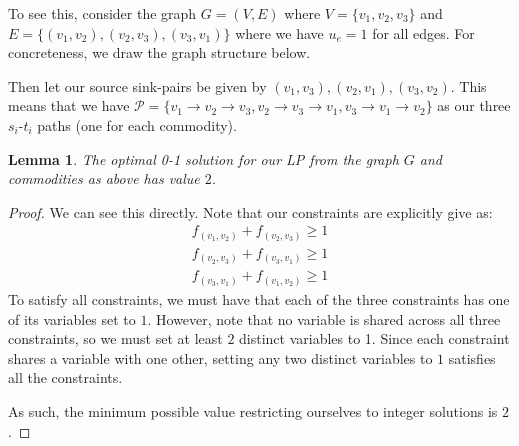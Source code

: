 \documentclass[12pt]{exam}
\newtheorem{lemma}[theorem]{Lemma}
\begin{document}
\begin{questions}
\begin{solution}
\begin{enumerate}[label=(\alph*)]
      To see this, consider the graph $G = (V,E)$ where $V = \{v_1, v_2, v_3\}$ and $E = \{ (v_1, v_2), (v_2, v_3), (v_3, v_1)\}$ where we have $u_e = 1$ for all edges. For concreteness, we draw the graph structure below.
      \begin{center}
      \end{center}
      Then let our source sink-pairs be given by $(v_1, v_3), (v_2, v_1), (v_3, v_2)$. This means that we have $\mathcal{P} = \{ v_1 \to v_2 \to v_3, v_2 \to v_3 \to v_1, v_3 \to v_1 \to v_2  \}$ as our three $s_i$-$t_i$ paths (one for each commodity).

      \begin{lemma}
        The optimal 0-1 solution for our LP from the graph $G$ and commodities as above has value $2$.
      \end{lemma}
      \begin{proof}
        We can see this directly. Note that our constraints are explicitly give as:
        \begin{align*}
          f_{(v_1,v_2)} + f_{(v_2, v_3)} \geq 1 \\
          f_{(v_2,v_3)} + f_{(v_3, v_1)} \geq 1 \\
          f_{(v_3,v_1)} + f_{(v_1, v_2)} \geq 1
        \end{align*}
        To satisfy all constraints, we must have that each of the three constraints has one of its variables set to $1$. However, note that no variable is shared across all three constraints, so we must set at least $2$ distinct variables to 1. Since each constraint shares a variable with one other, setting any two distinct variables to $1$ satisfies all the constraints.

        As such, the minimum possible value restricting ourselves to integer solutions is $2$.
      \end{proof}


\end{enumerate}
\end{solution}
\end{questions}
\end{document}
